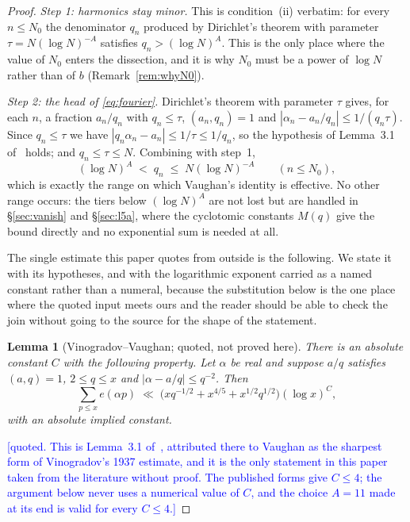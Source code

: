 \documentclass[11pt,a4paper]{article}
\theoremstyle{plain}
\newtheorem{lemma}[theorem]{Lemma}
\theoremstyle{definition}
\theoremstyle{remark}
\newcommand{\STATUS}[1]{\textcolor{blue}{\textsf{[#1]}}}
\begin{document}
\begin{proof}
\emph{Step 1: harmonics stay minor.} This is condition~(ii) verbatim: for every
$n\le N_0$ the denominator $q_n$ produced by Dirichlet's theorem with parameter
$\tau=N(\log N)^{-A}$ satisfies $q_n>(\log N)^{A}$. This is the only place where
the value of $N_0$ enters the dissection, and it is why $N_0$ must be a power of
$\log N$ rather than of $b$ (Remark~\ref{rem:whyN0}).

\emph{Step 2: the head of \eqref{eq:fourier}.} Dirichlet's theorem with
parameter $\tau$ gives, for each $n$, a fraction $a_n/q_n$ with $q_n\le\tau$,
$(a_n,q_n)=1$ and $|\alpha_n-a_n/q_n|\le1/(q_n\tau)$. Since $q_n\le\tau$ we have
$|q_n\alpha_n-a_n|\le1/\tau\le1/q_n$, so the hypothesis of Lemma~3.1
of~\cite{Ku05} holds; and $q_n\le\tau\le N$. Combining with step~1,
\begin{equation}\label{eq:qrange}
  (\log N)^{A}\;<\;q_n\;\le\;N(\log N)^{-A}\qquad(n\le N_0),
\end{equation}
which is exactly the range on which Vaughan's identity is effective. No other
range occurs: the tiers below $(\log N)^{A}$ are not lost but are handled in
\S\ref{sec:vanish} and \S\ref{sec:l5a}, where the cyclotomic constants $M(q)$
give the bound directly and no exponential sum is needed at all.

The single estimate this paper quotes from outside is the following. We state it
with its hypotheses, and with the logarithmic exponent carried as a named
constant rather than a numeral, because the substitution below is the one place
where the quoted input meets ours and the reader should be able to check the
join without going to the source for the shape of the statement.

\begin{lemma}[Vinogradov--Vaughan; quoted, not proved here]\label{lem:vv}
There is an absolute constant $C$ with the following property. Let $\alpha$ be
real and suppose $a/q$ satisfies $(a,q)=1$, $2\le q\le x$ and
$|\alpha-a/q|\le q^{-2}$. Then
\[
  \sum_{p\le x}e(\alpha p)\;\ll\;
  \bigl(xq^{-1/2}+x^{4/5}+x^{1/2}q^{1/2}\bigr)(\log x)^{C},
\]
with an absolute implied constant.
\end{lemma}

\STATUS{quoted. This is Lemma~3.1 of~\cite{Ku05}, attributed there to Vaughan as
the sharpest form of Vinogradov's 1937 estimate, and it is the only statement in
this paper taken from the literature without proof. The published forms give
$C\le4$; the argument below never uses a numerical value of $C$, and the choice
$A=11$ made at its end is valid for every $C\le4$.}


\end{proof}
\end{document}

